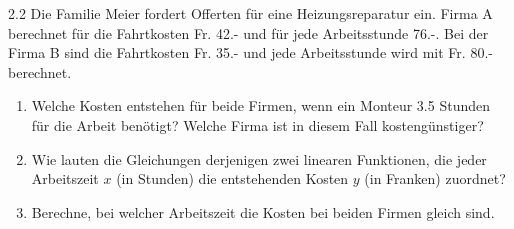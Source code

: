 \begin{exsol@exercise}{2.2}
    Die Familie Meier fordert Offerten f\"ur eine Heizungsreparatur
    ein. Firma A berechnet f\"ur die Fahrtkosten Fr. 42.- und f\"ur
    jede Arbeitsstunde 76.-. Bei der Firma B sind die Fahrtkosten
    Fr. 35.- und jede Arbeitsstunde wird mit Fr. 80.- berechnet.
    \begin{enumerate}[label=\alph*)]
    \item Welche Kosten entstehen f\"ur beide Firmen, wenn ein Monteur
      3.5 Stunden
      f\"ur die Arbeit benötigt? Welche Firma ist in diesem Fall
      kostengünstiger?

    \item Wie lauten die Gleichungen derjenigen zwei linearen
      Funktionen, die jeder Arbeitszeit $x$ (in Stunden) die
      entstehenden Kosten $y$ (in Franken) zuordnet?

    \item Berechne, bei welcher Arbeitszeit die Kosten bei beiden
      Firmen gleich sind.
    \end{enumerate}
\end{exsol@exercise}

